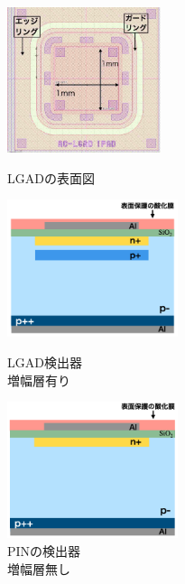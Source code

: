 \begin{figure}[h]
    \begin{minipage}[b]{0.38\linewidth}
        \centering
        \includegraphics[width=4.5cm]{fig/ch4/LGAD_surface.jpg}
        \caption{LGADの表面図}
        \label{fg:LGAD_surface}
    \end{minipage}
    \begin{minipage}[b]{0.3\linewidth}
        \centering
        \includegraphics[width=5cm]{fig/ch4/APD.png}
        \caption{LGAD検出器\\増幅層有り}
        \label{fg:APD}
    \end{minipage}
    \begin{minipage}[b]{0.3\linewidth}
        \centering
        \includegraphics[width=5cm]{fig/ch4/PIN.png}
        \caption{PINの検出器\\増幅層無し}
        \label{fg:PIN}
    \end{minipage}
\end{figure}

